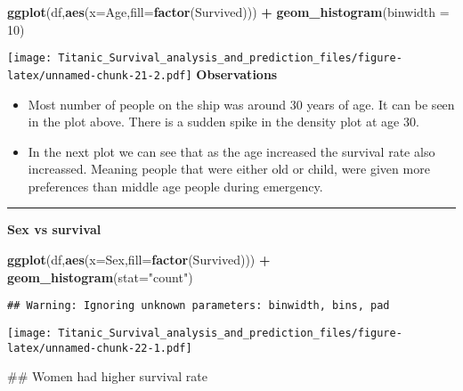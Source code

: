 \documentclass[]{article}
\newenvironment{Shaded}{\begin{snugshade}}{\end{snugshade}}
\newcommand{\KeywordTok}[1]{\textcolor[rgb]{0.13,0.29,0.53}{\textbf{#1}}}
\newcommand{\DataTypeTok}[1]{\textcolor[rgb]{0.13,0.29,0.53}{#1}}
\newcommand{\DecValTok}[1]{\textcolor[rgb]{0.00,0.00,0.81}{#1}}
\newcommand{\StringTok}[1]{\textcolor[rgb]{0.31,0.60,0.02}{#1}}
\newcommand{\OperatorTok}[1]{\textcolor[rgb]{0.81,0.36,0.00}{\textbf{#1}}}
\newcommand{\NormalTok}[1]{#1}
\providecommand{\tightlist}{%
  \setlength{\itemsep}{0pt}\setlength{\parskip}{0pt}}
\begin{document}
\begin{Shaded}
\begin{Highlighting}[]
\KeywordTok{ggplot}\NormalTok{(df,}\KeywordTok{aes}\NormalTok{(}\DataTypeTok{x=}\NormalTok{Age,}\DataTypeTok{fill=}\KeywordTok{factor}\NormalTok{(Survived))) }\OperatorTok{+}\StringTok{ }\KeywordTok{geom_histogram}\NormalTok{(}\DataTypeTok{binwidth =} \DecValTok{10}\NormalTok{)}
\end{Highlighting}
\end{Shaded}

\texttt{[image: Titanic\_Survival\_analysis\_and\_prediction\_files/figure-latex/unnamed-chunk-21-2.pdf]}
\textbf{Observations}

\begin{itemize}
\tightlist
\item
  Most number of people on the ship was around 30 years of age. It can
  be seen in the plot above. There is a sudden spike in the density plot
  at age 30.
\item
  In the next plot we can see that as the age increased the survival
  rate also increassed. Meaning people that were either old or child,
  were given more preferences than middle age people during emergency.
\end{itemize}

\begin{center}\rule{0.5\linewidth}{\linethickness}\end{center}

\textbf{Sex vs survival}

\begin{Shaded}
\begin{Highlighting}[]
\KeywordTok{ggplot}\NormalTok{(df,}\KeywordTok{aes}\NormalTok{(}\DataTypeTok{x=}\NormalTok{Sex,}\DataTypeTok{fill=}\KeywordTok{factor}\NormalTok{(Survived))) }\OperatorTok{+}\StringTok{ }\KeywordTok{geom_histogram}\NormalTok{(}\DataTypeTok{stat=}\StringTok{"count"}\NormalTok{)}
\end{Highlighting}
\end{Shaded}

\begin{verbatim}
## Warning: Ignoring unknown parameters: binwidth, bins, pad
\end{verbatim}

\texttt{[image: Titanic\_Survival\_analysis\_and\_prediction\_files/figure-latex/unnamed-chunk-22-1.pdf]}

\begin{Shaded}
\begin{Highlighting}[]
\NormalTok{## Women had higher survival rate}
\end{Highlighting}
\end{Shaded}
\end{document}
